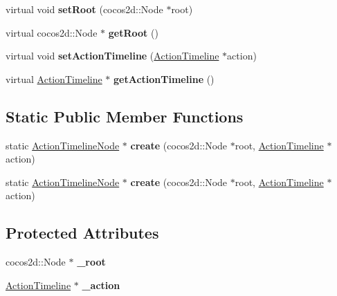 \begin{DoxyCompactItemize}
virtual void {\bfseries set\+Root} (cocos2d\+::\+Node $\ast$root)
\item 
\mbox{\label{classActionTimelineNode_ab6ba179aaf635bd9c9969db5a368724f}} 
virtual cocos2d\+::\+Node $\ast$ {\bfseries get\+Root} ()
\item 
\mbox{\label{classActionTimelineNode_a52206a5ffe78b6d3cad866f8ef939e57}} 
virtual void {\bfseries set\+Action\+Timeline} (\hyperlink{classActionTimeline}{Action\+Timeline} $\ast$action)
\item 
\mbox{\label{classActionTimelineNode_a55ca7938af8ef5e4e9d74c49d46a8c2c}} 
virtual \hyperlink{classActionTimeline}{Action\+Timeline} $\ast$ {\bfseries get\+Action\+Timeline} ()
\end{DoxyCompactItemize}
\subsection*{Static Public Member Functions}
\begin{DoxyCompactItemize}
\item 
\mbox{\label{classActionTimelineNode_a145cb1333d41e5b63e9adc8f8a0f013c}} 
static \hyperlink{classActionTimelineNode}{Action\+Timeline\+Node} $\ast$ {\bfseries create} (cocos2d\+::\+Node $\ast$root, \hyperlink{classActionTimeline}{Action\+Timeline} $\ast$action)
\item 
\mbox{\label{classActionTimelineNode_a09c29eae5288324f999382e5a7dbae2e}} 
static \hyperlink{classActionTimelineNode}{Action\+Timeline\+Node} $\ast$ {\bfseries create} (cocos2d\+::\+Node $\ast$root, \hyperlink{classActionTimeline}{Action\+Timeline} $\ast$action)
\end{DoxyCompactItemize}
\subsection*{Protected Attributes}
\begin{DoxyCompactItemize}
\item 
\mbox{\label{classActionTimelineNode_a96cd5890ef579174d8fbf0ab2b96466d}} 
cocos2d\+::\+Node $\ast$ {\bfseries \+\_\+root}
\item 
\mbox{\label{classActionTimelineNode_a2883a9272c22fc5cea756a1bffcc315a}} 
\hyperlink{classActionTimeline}{Action\+Timeline} $\ast$ {\bfseries \+\_\+action}
\end{DoxyCompactItemize}


